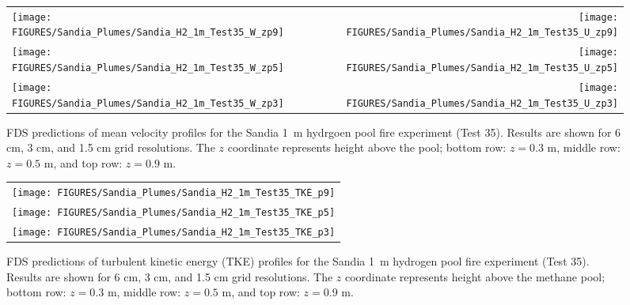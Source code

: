 \begin{figure}[p]
\begin{tabular*}{\textwidth}{l@{\extracolsep{\fill}}r}
\texttt{[image: FIGURES/Sandia\_Plumes/Sandia\_H2\_1m\_Test35\_W\_zp9]} &
\texttt{[image: FIGURES/Sandia\_Plumes/Sandia\_H2\_1m\_Test35\_U\_zp9]} \\
\texttt{[image: FIGURES/Sandia\_Plumes/Sandia\_H2\_1m\_Test35\_W\_zp5]} &
\texttt{[image: FIGURES/Sandia\_Plumes/Sandia\_H2\_1m\_Test35\_U\_zp5]} \\
\texttt{[image: FIGURES/Sandia\_Plumes/Sandia\_H2\_1m\_Test35\_W\_zp3]} &
\texttt{[image: FIGURES/Sandia\_Plumes/Sandia\_H2\_1m\_Test35\_U\_zp3]}
\end{tabular*}
\caption[Sandia 1~m hydrogen pool fire (Test 35) mean velocity profiles.]
{FDS predictions of mean velocity profiles for the Sandia 1~m hydrgoen pool fire experiment (Test 35). Results are shown for 6 cm, 3 cm, and 1.5 cm grid resolutions. The $z$ coordinate represents height above the pool; bottom row: $z=0.3$ m, middle row: $z=0.5$ m, and top row: $z=0.9$ m.}
\label{Sandia_H2_1m_Test35_velocity}
\end{figure}

\begin{figure}[p]
\begin{center}
\begin{tabular}{c}
\texttt{[image: FIGURES/Sandia\_Plumes/Sandia\_H2\_1m\_Test35\_TKE\_p9]} \\
\texttt{[image: FIGURES/Sandia\_Plumes/Sandia\_H2\_1m\_Test35\_TKE\_p5]} \\
\texttt{[image: FIGURES/Sandia\_Plumes/Sandia\_H2\_1m\_Test35\_TKE\_p3]}
\end{tabular}
\caption[Sandia 1~m hydrogen pool fire (Test 25) turbulent kinetic energy.]
{FDS predictions of turbulent kinetic energy (TKE) profiles for the Sandia 1~m hydrogen pool fire experiment (Test 35). Results are shown for 6 cm, 3 cm, and 1.5 cm grid resolutions. The $z$ coordinate represents height above the methane pool; bottom row: $z=0.3$ m, middle row: $z=0.5$ m, and top row: $z=0.9$ m.}
\label{Sandia_H2_1m_Test35_tke}
\end{center}
\end{figure}





